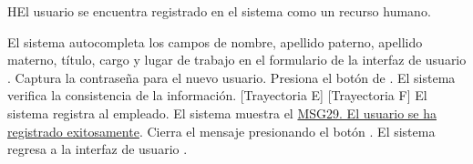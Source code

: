 
\begin{UCtrayectoriaA}{H}{El usuario se encuentra registrado en el sistema como un recurso humano.}
    
    \UCpaso El sistema autocompleta los campos de nombre, apellido paterno, apellido materno, título, cargo y lugar de trabajo en el formulario de la interfaz de usuario .
    \UCpaso[\UCactor] Captura la contraseña para el nuevo usuario.
    \UCpaso[\UCactor] Presiona el botón de .
    \UCpaso El sistema verifica la consistencia de la información. [Trayectoria E] [Trayectoria F]
    \UCpaso El sistema registra al empleado.
    \UCpaso  El sistema muestra el \hyperref[MSG29]{MSG29. El usuario se ha registrado exitosamente}.    
    \UCpaso[\UCactor] Cierra el mensaje presionando el botón .
    \UCpaso El sistema regresa a la interfaz de usuario .
\end{UCtrayectoriaA}
